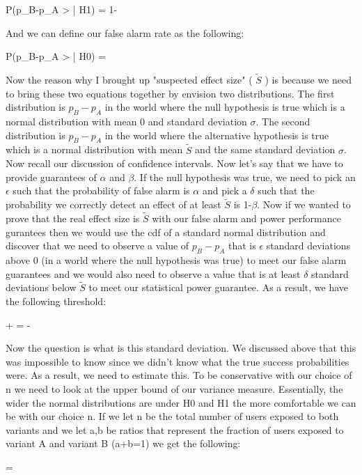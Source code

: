 \beq
P(p_B-p_A > \delta\sigma | H1) = 1-\beta
\eeq

And we can define our false alarm rate as the following: 

\beq
P(p_B-p_A > \epsilon\sigma | H0) = \alpha
\eeq

Now the reason why I brought up "suspected effect size" ( $\widetilde{S}$ ) is because we need to bring these two equations together
by envision two distributions. The first distribution is $p_B-p_A$ in the world where the null hypothesis is true which is a normal 
distribution with mean 0 and standard deviation $\sigma$. The second distribution is $p_B-p_A$ in the world where the alternative 
hypothesis is true which is a normal distribution with mean $\widetilde{S}$ and the same standard deviation $\sigma$. Now recall our
discussion of confidence intervals. Now let's say that we have to provide guarantees of $\alpha$ and $\beta$. 
If the null hypothesis was true, we need to pick an $\epsilon$ such that the probability of false alarm is $\alpha$ and pick 
a $\delta$ such that the probability we correctly detect an effect of at least $\widetilde{S}$ is 1-$\beta$. Now if we wanted to prove 
that the real effect size is $\widetilde{S}$ with our false alarm and power performance gurantees then we would use the cdf of a standard 
normal distribution and discover that we need to observe a value of $p_B-p_A$ that is $\epsilon$ standard deviations above 0 (in a world where 
the null hypothesis was true) to meet our false alarm guarantees and we would also need to observe a value that is at least $\delta$ standard 
deviations below $\widetilde{S}$ to meet our statistical power guarantee. As a result, we have the following threshold: 

 + \epsilon\sigma =  - \delta\sigma
\eeq

Now the question is what is this standard deviation. We discussed above that this was impossible to know since we didn't know what the true 
success probabilities were. As a result, we need to estimate this. To be conservative with our choice of n we need to look at the upper bound 
of our variance measure. Essentially, the wider the normal distributions are under H0 and H1 the more comfortable we can be with our choice n. 
If we let n be the total number of users exposed to both variants and we let a,b be ratios that represent the fraction of users exposed to variant
A and variant B (a+b=1) we get the following:

\beq
\sigma = 
\eeq

